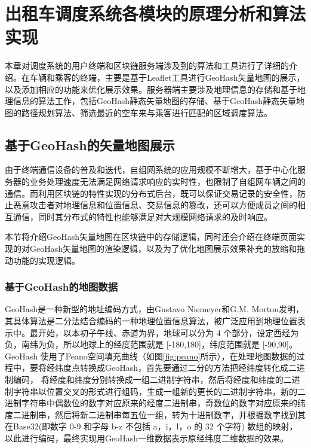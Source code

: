 \chapter{出租车调度系统各模块的原理分析和算法实现}

本章对调度系统的用户终端和区块链服务端涉及到的算法和工具进行了详细的介绍。在车辆和乘客的终端，主要是基于Leaflet工具进行GeoHash矢量地图的展示，以及添加相应的功能来优化展示效果。服务器端主要涉及地理信息的存储和基于地理信息的算法工作，包括GeoHash静态矢量地图的存储、基于GeoHash静态矢量地图的路径规划算法、筛选最近的空车来与乘客进行匹配的区域调度算法。

\section{基于GeoHash的矢量地图展示}

由于终端通信设备的普及和迭代，自组网系统的应用规模不断增大，基于中心化服务器的业务处理速度无法满足网络请求响应的实时性，也限制了自组网车辆之间的通信。而利用区块链的特性实现的分布式后台，既可以保证交易记录的安全性，防止恶意攻击者对地理信息和位置信息、交易信息的篡改，还可以方便成员之间的相互通信，同时其分布式的特性也能够满足对大规模网络请求的及时响应。

本节将介绍GeoHash矢量地图在区块链中的存储逻辑，同时还会介绍在终端页面实现的对GeoHash矢量地图的渲染逻辑，以及为了优化地图展示效果补充的放缩和拖动功能的实现逻辑。

\subsection{基于GeoHash的地图数据}

GeoHash是一种新型的地址编码方式，由Gustavo Niemeyer和G.M. Morton发明，其具体算法是二分法结合编码的一种地理位置信息算法，被广泛应用到地理位置表示中。最开始，以本初子午线、赤道为界，地球可以分为 4 个部分，设定西经为负，南纬为负，所以地球上的经度范围就是 [-180,180]，纬度范围就是 [-90,90]。GeoHash 使用了Peano空间填充曲线（如图\ref{fig:peano}所示），在处理地图数据的过程中，要将经纬度点转换成GeoHash，首先要通过二分的方法把经纬度转化成二进制编码，
将经度和纬度分别转换成一组二进制字符串，然后将经度和纬度的二进制字符串以位置交叉的形式进行组码，生成一组新的更长的二进制字符串，新的二进制字符串中偶数位的数字对应原来的经度二进制串，奇数位的数字对应原来的纬度二进制串，然后将新二进制串每五位一组，转为十进制数字，并根据数字找到其在Base32(即数字 0-9 和字母 b-z 不包括 a，i，l，o 的 32 个字符) 数组的映射，以此进行编码，最终实现用GeoHash一维数据表示原经纬度二维数据的效果。

